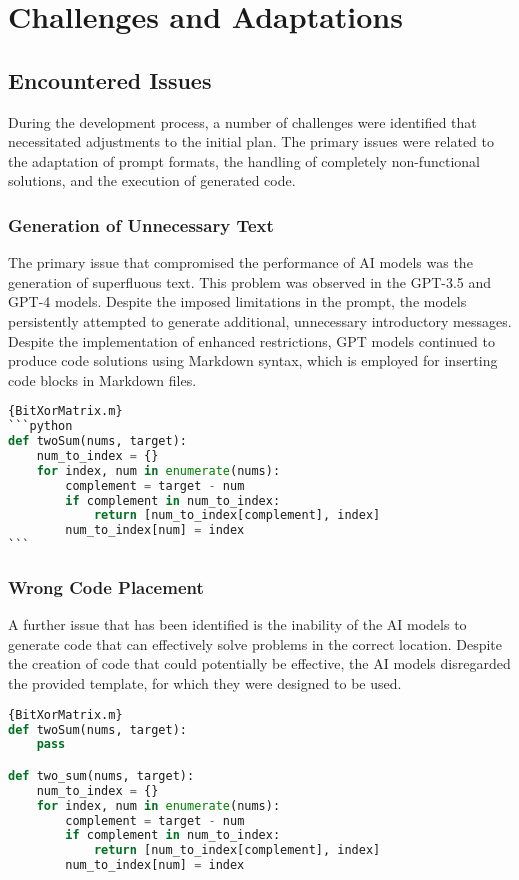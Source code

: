 
\section{Challenges and Adaptations}



\subsection{Encountered Issues}

During the development process, a number of challenges were identified that necessitated adjustments to the initial plan. The primary issues were related to the adaptation of prompt formats, the handling of completely non-functional solutions, and the execution of generated code.
\subsubsection{Generation of Unnecessary Text}
The primary issue that compromised the performance of AI models was the generation of superfluous text. This problem was observed in the GPT-3.5 and GPT-4 models. Despite the imposed limitations in the prompt, the models persistently attempted to generate additional, unnecessary introductory messages. Despite the implementation of enhanced restrictions, GPT models continued to produce code solutions using Markdown syntax, which is employed for inserting code blocks in Markdown files.

\begin{lstlisting}[language=Python]{BitXorMatrix.m}
```python
def twoSum(nums, target):
    num_to_index = {}
    for index, num in enumerate(nums):
        complement = target - num
        if complement in num_to_index:
            return [num_to_index[complement], index]
        num_to_index[num] = index
```
\end{lstlisting}

\subsubsection{Wrong Code Placement}
A further issue that has been identified is the inability of the AI models to generate code that can effectively solve problems in the correct location. Despite the creation of code that could potentially be effective, the AI models disregarded the provided template, for which they were designed to be used.

\begin{lstlisting}[language=Python]{BitXorMatrix.m}
def twoSum(nums, target):
    pass

def two_sum(nums, target):
    num_to_index = {}
    for index, num in enumerate(nums):
        complement = target - num
        if complement in num_to_index:
            return [num_to_index[complement], index]
        num_to_index[num] = index
    \end{lstlisting}

